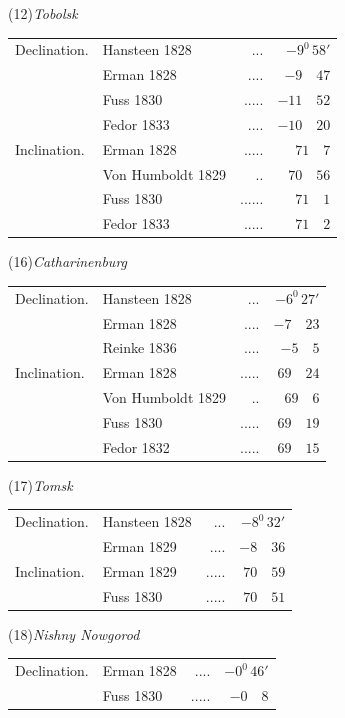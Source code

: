 \begin{center}
\begin{minipage}[t]{\linewidth}\centering
(12)\quad\textit{Tobolsk}\par\smallskip
\begin{tabular}{llrr}
Declination.&Hansteen 1828&.\quad.\quad.&$-9^0\,58'$\\
&Erman 1828&.\quad.\quad.\quad.&$-9\quad47$\\
&Fuss 1830&.\quad.\quad.\quad.\quad.&$-11\quad52$\\
&Fedor 1833&.\quad.\quad.\quad.&$-10\quad20$\\
Inclination.&Erman 1828&.\quad.\quad.\quad.\quad.&$71\quad7$\\
&Von Humboldt 1829&.\quad.&$70\quad56$\\
&Fuss 1830&.\quad.\quad.\quad.\quad.\quad.&$71\quad1$\\
&Fedor 1833&.\quad.\quad.\quad.\quad.&$71\quad2$
\end{tabular}
\end{minipage}\par\medskip
\begin{minipage}[t]{\linewidth}\centering
(16)\quad\textit{Catharinenburg}\par\smallskip
\begin{tabular}{llrr}
Declination.&Hansteen 1828&.\quad.\quad.&$-6^0\,27'$\\
&Erman 1828&.\quad.\quad.\quad.&$-7\quad23$\\
&Reinke 1836&.\quad.\quad.\quad.&$-5\quad5$\\
Inclination.&Erman 1828&.\quad.\quad.\quad.\quad.&$69\quad24$\\
&Von Humboldt 1829&.\quad.&$69\quad6$\\
&Fuss 1830&.\quad.\quad.\quad.\quad.&$69\quad19$\\
&Fedor 1832&.\quad.\quad.\quad.\quad.&$69\quad15$
\end{tabular}
\end{minipage}\par\medskip
\begin{minipage}[t]{\linewidth}\centering
(17)\quad\textit{Tomsk}\par\smallskip
\begin{tabular}{llrr}
Declination.&Hansteen 1828&.\quad.\quad.&$-8^0\,32'$\\
&Erman 1829&.\quad.\quad.\quad.&$-8\quad36$\\
Inclination.&Erman 1829&.\quad.\quad.\quad.\quad.&$70\quad59$\\
&Fuss 1830&.\quad.\quad.\quad.\quad.&$70\quad51$
\end{tabular}
\end{minipage}\par\medskip
\begin{minipage}[t]{\linewidth}\centering
(18)\quad\textit{Nishny Nowgorod}\par\smallskip
\begin{tabular}{llrr}
Declination.&Erman 1828&.\quad.\quad.\quad.&$-0^0\,46'$\\
&Fuss 1830&.\quad.\quad.\quad.\quad.&$-0\quad8$
\end{tabular}
\end{minipage}
\end{center}
